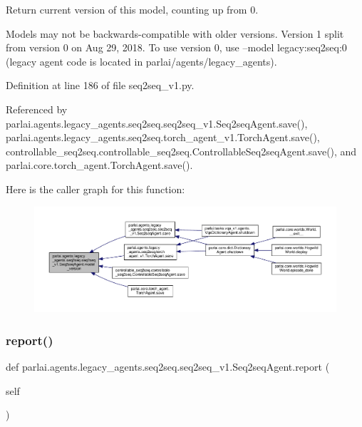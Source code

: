 \begin{DoxyVerb}Return current version of this model, counting up from 0.

Models may not be backwards-compatible with older versions.
Version 1 split from version 0 on Aug 29, 2018.
To use version 0, use --model legacy:seq2seq:0
(legacy agent code is located in parlai/agents/legacy_agents).
\end{DoxyVerb}
 

Definition at line 186 of file seq2seq\+\_\+v1.\+py.



Referenced by parlai.\+agents.\+legacy\+\_\+agents.\+seq2seq.\+seq2seq\+\_\+v1.\+Seq2seq\+Agent.\+save(), parlai.\+agents.\+legacy\+\_\+agents.\+seq2seq.\+torch\+\_\+agent\+\_\+v1.\+Torch\+Agent.\+save(), controllable\+\_\+seq2seq.\+controllable\+\_\+seq2seq.\+Controllable\+Seq2seq\+Agent.\+save(), and parlai.\+core.\+torch\+\_\+agent.\+Torch\+Agent.\+save().

Here is the caller graph for this function\+:
\nopagebreak
\begin{figure}[H]
\begin{center}
\leavevmode
\includegraphics[width=350pt]{classparlai_1_1agents_1_1legacy__agents_1_1seq2seq_1_1seq2seq__v1_1_1Seq2seqAgent_a3838eb2d88b4e9f80c9c234e6742fa30_icgraph}
\end{center}
\end{figure}
\mbox{\label{classparlai_1_1agents_1_1legacy__agents_1_1seq2seq_1_1seq2seq__v1_1_1Seq2seqAgent_ae588ce85bae56791bac9dd744e5414ce}} 
\subsubsection{\texorpdfstring{report()}{report()}}
{\footnotesize\ttfamily def parlai.\+agents.\+legacy\+\_\+agents.\+seq2seq.\+seq2seq\+\_\+v1.\+Seq2seq\+Agent.\+report (\begin{DoxyParamCaption}\item[{}]{self }\end{DoxyParamCaption})}

